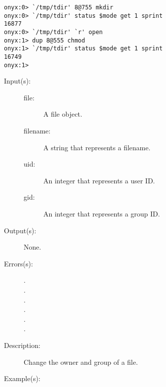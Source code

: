 \begin{description}
\begin{description}
\begin{verbatim}
onyx:0> `/tmp/tdir' 8@755 mkdir 
onyx:0> `/tmp/tdir' status $mode get 1 sprint
16877
onyx:0> `/tmp/tdir' `r' open 
onyx:1> dup 8@555 chmod
onyx:1> `/tmp/tdir' status $mode get 1 sprint
16749
onyx:1>
		\end{verbatim}
	\end{description}
\label{systemdict:chown}
\item[{\onyxop{file/filename uid gid}{chown}{--}}: ]
	\begin{description}\item[]
	\item[Input(s): ]
		\begin{description}\item[]
		\item[file: ]
			A file object.
		\item[filename: ]
			A string that represents a filename.
		\item[uid: ]
			An integer that represents a user ID.
		\item[gid: ]
			An integer that represents a group ID.
		\end{description}
	\item[Output(s): ] None.
	\item[Errors(s): ]
		\begin{description}\item[]
		\item[.]
		\item[.]
		\item[.]
		\item[.]
		\item[.]
		\item[.]
		\end{description}
	\item[Description: ]
		Change the owner and group of a file.
	\item[Example(s): ]\begin{verbatim}


\end{verbatim}
\end{description}
\end{description}

